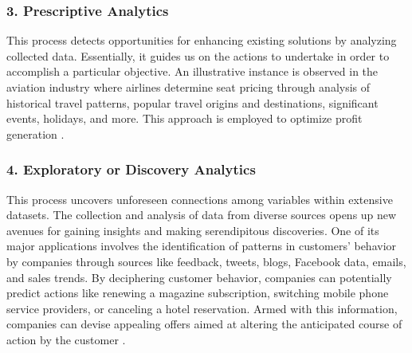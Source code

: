 \subsubsection{3. Prescriptive Analytics}

This process detects opportunities for enhancing existing solutions by analyzing collected data.
Essentially, it guides us on the actions to undertake in order to accomplish a particular objective.
An illustrative instance is observed in the aviation industry where airlines determine seat pricing through analysis of historical travel patterns, popular travel origins and destinations, significant events, holidays, and more.
This approach is employed to optimize profit generation \autocite{rajaraman2016big}.

\subsubsection{4. Exploratory or Discovery Analytics}

This process uncovers unforeseen connections among variables within extensive datasets.
The collection and analysis of data from diverse sources opens up new avenues for gaining insights and making serendipitous discoveries.
One of its major applications involves the identification of patterns in customers' behavior by companies through sources like feedback, tweets, blogs, Facebook data, emails, and sales trends.
By deciphering customer behavior, companies can potentially predict actions like renewing a magazine subscription, switching mobile phone service providers, or canceling a hotel reservation. Armed with this information, companies can devise appealing offers aimed at altering the anticipated course of action by the customer \autocite{rajaraman2016big}.